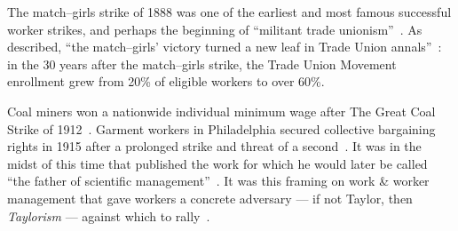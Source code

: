 \documentclass[trackingWork]{subfiles}
\begin{document}
The match--girls strike of 1888 was one of the earliest and most famous successful worker strikes,
and perhaps the beginning of ``militant trade unionism''~\cite{10.2307/3827491}.
As \citeauthor{weyer1894history} described,
``the match--girls' victory turned a new leaf in Trade Union annals''~\cite{weyer1894history}: in the 30 years after the match--girls strike,
the Trade Union Movement enrollment grew from 20\% of eligible workers to over 60\%.

Coal miners won a nationwide individual minimum wage after The Great Coal Strike of 1912~\cite{10.2307/2221944}.
Garment workers in Philadelphia secured collective bargaining rights in 1915 after a prolonged strike and threat of a second~\cite{10.2307/41829256}.
It was in the midst of this time that \citeauthor{taylor1914principles} published
the work for which he would later be called ``the father of scientific management''~\cite{RePEc:mtp:titles:0262612062}.
It was this framing on work \& worker management that gave workers a concrete adversary
--- if not Taylor, then \textit{Taylorism}  ---
against which to rally~\cite{jacoby1983union,parker1920casual}.



\onlyinsubfile{\clearpage}
\end{document}
